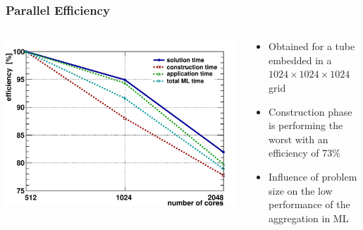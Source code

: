 \documentclass[xcolor=pdftex,table,10pt]{beamer}
\begin{document}
	\begin{frame}
		\frametitle{Parallel Efficiency}
		
		\begin{columns}
		\begin{column}{6.5cm}
            \centering
		        \includegraphics[width=0.99\textwidth]{plots/eff_1024_lin-crop.pdf}
        \end{column}
        \begin{column}{4.5cm}
            \begin{itemize} 
                \item Obtained for a tube embedded in a $1024\times1024\times1024$ grid
                \item Construction phase is performing the worst with an efficiency of 73\%
                \item Influence of problem size on the low performance of the aggregation in ML
            \end{itemize}
        \end{column}
        \end{columns}

	\end{frame}
	
\end{document}
